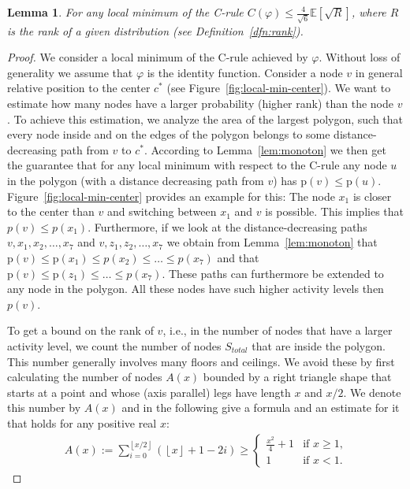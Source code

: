 \documentclass[conference]{IEEEtran}
\def\E{\mathbb{E}}
\def\p{\mathrm{p}}
\newtheorem{lemma}{Lemma}
\begin{document}
\begin{lemma}\label{lemma:c-rule-upper}
For any local minimum of the C-rule $C(\varphi) \le  \frac{4}{\sqrt{6}} \E[\sqrt{R}]$, where $R$ is the rank of a given distribution (see Definition~\ref{dfn:rank}). 
\end{lemma}
\begin{proof}
We consider a local minimum of the C-rule achieved by $\varphi$. Without loss of generality we assume that $\varphi$ is the identity function. Consider a node $v$ in general relative position to the center $c^*$ (see Figure~\ref{fig:local-min-center}). We want to estimate how many nodes have a larger probability (higher rank) than the node $v$. To achieve this estimation, we analyze the area of the largest polygon, such that every node inside and on the edges of the polygon belongs to some distance-decreasing path from $v$ to $c^*$. According to Lemma~\ref{lem:monoton} we then get the guarantee that for any local minimum with respect to the C-rule any node $u$ in the polygon (with a distance decreasing path from $v$) has $\p(v) \leq \p(u)$. Figure~\ref{fig:local-min-center} provides an example for this: The node $x_1$ is closer to the center than $v$ and switching between $x_1$ and $v$ is possible. This implies that $p(v) \leq p(x_1)$. Furthermore, if we look at the distance-decreasing paths $v,x_1,x_2,\ldots,x_7$ and $v,z_1,z_2,\ldots,x_7$ we obtain from Lemma~\ref{lem:monoton} that $\p(v) \leq \p(x_1) \leq p(x_2) \leq \ldots \leq p(x_7)$ and that $\p(v) \leq \p(z_1) \leq \ldots \leq p(x_7)$. These paths can furthermore be extended to any node in the polygon. All these nodes have such higher activity levels then $p(v)$. 







To get a bound on the rank of $v$, i.e., in the number of nodes that have a larger activity level, we count the number of nodes $S_{total}$ that are inside the polygon. This number generally involves many floors and ceilings. We avoid these by first calculating the number of nodes $A(x)$ bounded by a right triangle shape that starts at a point and whose (axis parallel) legs have length $x$ and $x/2$. We denote this number by $A(x)$ and in the following give a formula and an estimate for it that holds for any positive real $x$:
\begin{align*}
A(x):=\sum_{i=0}^{\left\lfloor x/2\right\rfloor}(\left\lfloor x\right\rfloor + 1 -2i)\ge
\begin{cases} \frac{x^2}{4}+1 & \text{if $x\ge1$,}
\\
1 & \text{if $x<1$.}
\end{cases}
\end{align*}





\end{proof}
\end{document}
